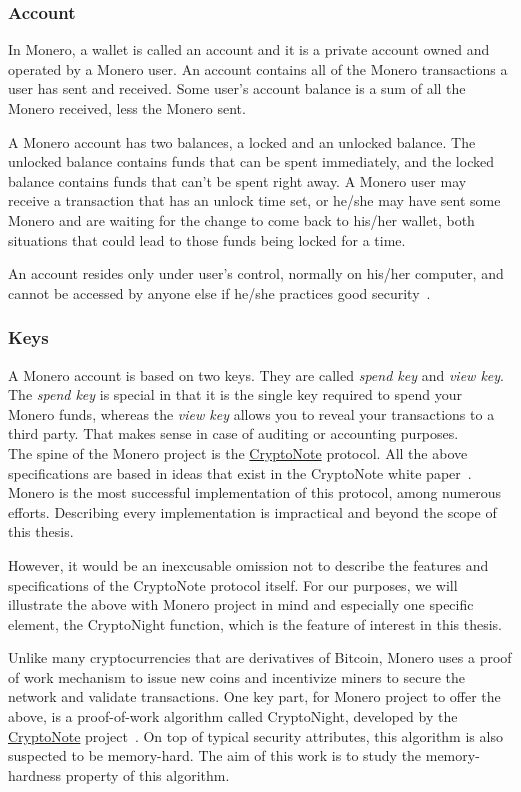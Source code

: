 \subsubsection{Account}
In Monero, a wallet is called an account and it is a private account owned and operated by a Monero user. An account contains all of the Monero transactions a user has sent and received. Some user's account balance is a sum of all the Monero received, less the Monero sent.

A Monero account has two balances, a locked and an unlocked balance. The unlocked balance contains funds that can be spent immediately, and the locked balance contains funds that can't be spent right away. A Monero user may receive a transaction that has an unlock time set, or he/she may have sent some Monero and are waiting for the change to come back to his/her wallet, both situations that could lead to those funds being locked for a time.

An account resides only under user's control, normally on his/her computer, and cannot be accessed by anyone else if he/she practices good security~\cite{getmonero}.

\subsubsection{Keys}
A Monero account is based on two keys. They are called \emph{spend key} and \emph{view key}. The \emph{spend key} is special in that it is the single key required to spend your Monero funds, whereas the \emph{view key} allows you to reveal your transactions to a third party. That makes sense in case of auditing or accounting purposes.\\

The spine of the Monero project is the \hyperref[sec:CryptoNote]{CryptoNote} protocol. All the above specifications are based in ideas that exist in the CryptoNote white paper~\cite{citeulike:14139412}. Monero is the most successful implementation of this protocol, among numerous efforts. Describing every implementation is impractical and beyond the scope of this thesis.

However, it would be an inexcusable omission not to describe the features and specifications of the CryptoNote protocol itself. For our purposes, we will illustrate the above with Monero project in mind and especially one specific element, the CryptoNight function, which is the feature of interest in this thesis.

Unlike many cryptocurrencies that are derivatives of Bitcoin, Monero uses a proof of work mechanism to issue new coins and incentivize miners to secure the network and validate transactions. One key part, for Monero project to offer the above, is a proof-of-work algorithm called CryptoNight, developed by the \hyperref[sec:CryptoNote]{CryptoNote} project~\cite{citeulike:14139412}. On top of typical security attributes, this algorithm is also suspected to be memory-hard. The aim of this work is to study the memory-hardness property of this algorithm.
%
